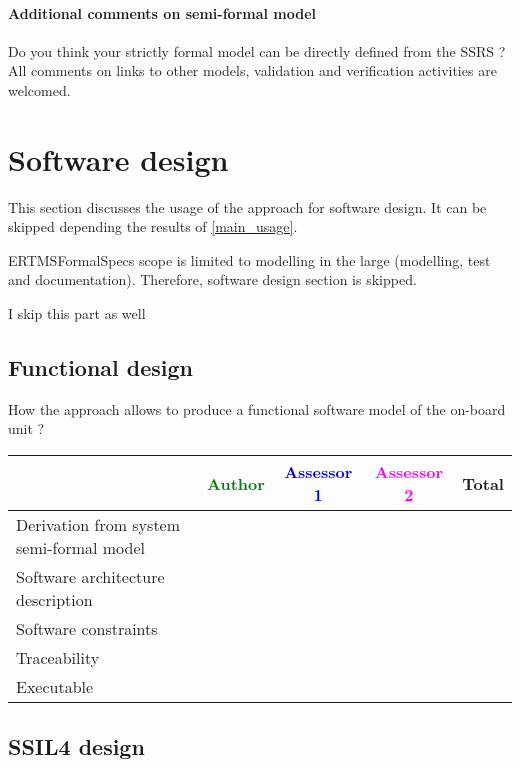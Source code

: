 \paragraph{Additional comments on semi-formal  model} Do you think your strictly formal  model can be directly defined from the SSRS ?
All comments on links to  other models, validation and verification activities are welcomed.


\section{Software design}
This section discusses the usage of the approach for software design.
It can be skipped depending the results of \ref{main_usage}.

\begin{author_comment}
ERTMSFormalSpecs scope is limited to modelling in the large (modelling, test and documentation). Therefore, software design section is skipped.  
\end{author_comment}

\begin{assessor1}
I skip this part as well
\end{assessor1}

\subsection{Functional design}

How the approach allows to  produce a functional software model of the on-board unit ?

\begin{tabular}{|l | c | c | c | c|}
\hline
& \textcolor{green}{Author} & \textcolor{blue}{Assessor 1} & \textcolor{magenta}{Assessor 2} & Total \\
\hline
Derivation from system semi-formal model  & & & &  \\
\hline 
Software architecture description  & & & &  \\
\hline
Software constraints  & & & &  \\
\hline
Traceability  & & & &  \\
\hline
Executable  & & & &  \\
\hline
\end{tabular}

\subsection{SSIL4 design}

